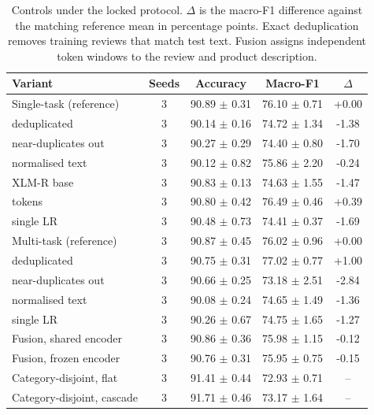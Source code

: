 \begin{table}[t]
\caption{Controls under the locked protocol. $\Delta$ is the macro-F1 difference against the matching reference mean in percentage points. Exact deduplication removes training reviews that match test text. Fusion assigns independent token windows to the review and product description.}
\label{tab:controls}
\centering
\small
\setlength{\tabcolsep}{1.5pt}
\begin{tabular}{@{}lcccc@{}}
\toprule
Variant & Seeds & Accuracy & Macro-F1 & $\Delta$ \\
\midrule
Single-task (reference) & 3 & 90.89 $\pm$ 0.31 & 76.10 $\pm$ 0.71 & +0.00 \\
\quad deduplicated & 3 & 90.14 $\pm$ 0.16 & 74.72 $\pm$ 1.34 & -1.38 \\
\quad near-duplicates out & 3 & 90.27 $\pm$ 0.29 & 74.40 $\pm$ 0.80 & -1.70 \\
\quad normalised text & 3 & 90.12 $\pm$ 0.82 & 75.86 $\pm$ 2.20 & -0.24 \\
\quad XLM-R base & 3 & 90.83 $\pm$ 0.13 & 74.63 $\pm$ 1.55 & -1.47 \\
\quad 128 tokens & 3 & 90.80 $\pm$ 0.42 & 76.49 $\pm$ 0.46 & +0.39 \\
\quad single LR & 3 & 90.48 $\pm$ 0.73 & 74.41 $\pm$ 0.37 & -1.69 \\
\midrule
Multi-task (reference) & 3 & 90.87 $\pm$ 0.45 & 76.02 $\pm$ 0.96 & +0.00 \\
\quad deduplicated & 3 & 90.75 $\pm$ 0.31 & 77.02 $\pm$ 0.77 & +1.00 \\
\quad near-duplicates out & 3 & 90.66 $\pm$ 0.25 & 73.18 $\pm$ 2.51 & -2.84 \\
\quad normalised text & 3 & 90.08 $\pm$ 0.24 & 74.65 $\pm$ 1.49 & -1.36 \\
\quad single LR & 3 & 90.26 $\pm$ 0.67 & 74.75 $\pm$ 1.65 & -1.27 \\
\midrule
Fusion, shared encoder & 3 & 90.86 $\pm$ 0.36 & 75.98 $\pm$ 1.15 & -0.12 \\
Fusion, frozen encoder & 3 & 90.76 $\pm$ 0.31 & 75.95 $\pm$ 0.75 & -0.15 \\
\midrule
Category-disjoint, flat & 3 & 91.41 $\pm$ 0.44 & 72.93 $\pm$ 0.71 & -- \\
Category-disjoint, cascade & 3 & 91.71 $\pm$ 0.46 & 73.17 $\pm$ 1.64 & -- \\
\bottomrule
\end{tabular}
\end{table}
